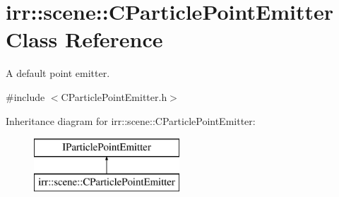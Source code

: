 \hypertarget{classirr_1_1scene_1_1_c_particle_point_emitter}{\section{irr\-:\-:scene\-:\-:C\-Particle\-Point\-Emitter Class Reference}
\label{classirr_1_1scene_1_1_c_particle_point_emitter}
}


A default point emitter.  




{\ttfamily \#include $<$C\-Particle\-Point\-Emitter.\-h$>$}

Inheritance diagram for irr\-:\-:scene\-:\-:C\-Particle\-Point\-Emitter\-:\begin{figure}[H]
\begin{center}
\leavevmode
\includegraphics[height=2.000000cm]{classirr_1_1scene_1_1_c_particle_point_emitter}
\end{center}
\end{figure}
